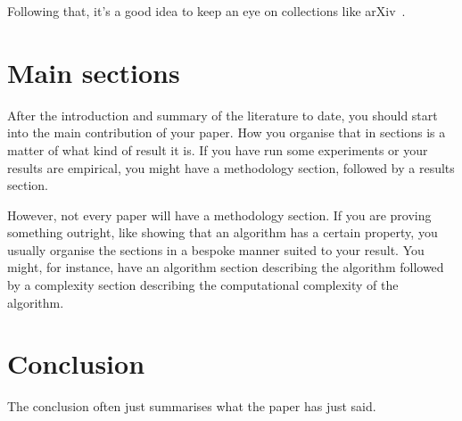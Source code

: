 \documentclass[journal]{IEEEtran}
\begin{document}
    Following that, it's a good idea to keep an eye on collections like
    arXiv~\cite{arxiv:home}.

  \section{Main sections}
    After the introduction and summary of the literature to date, you should start
    into the main contribution of your paper. How you organise that in sections
    is a matter of what kind of result it is. If you have run some experiments
    or your results are empirical, you might have a methodology section, followed
    by a results section.

    However, not every paper will have a methodology section. If you are proving
    something outright, like showing that an algorithm has a certain property,
    you usually organise the sections in a bespoke manner suited to your result.
    You might, for instance, have an algorithm section describing the algorithm
    followed by a complexity section describing the computational complexity of
    the algorithm.

  \section{Conclusion}
    The conclusion often just summarises what the paper has just said.

  
  
\end{document}
